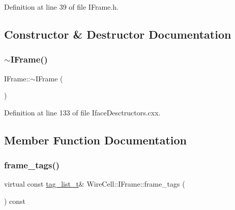 Definition at line 39 of file I\+Frame.\+h.



\subsection{Constructor \& Destructor Documentation}
\mbox{\label{class_wire_cell_1_1_i_frame_a7f25061ae34cc3ec3b3a18805cde79bb}} 
\subsubsection{\texorpdfstring{$\sim$\+I\+Frame()}{~IFrame()}}
{\footnotesize\ttfamily I\+Frame\+::$\sim$\+I\+Frame (\begin{DoxyParamCaption}{ }\end{DoxyParamCaption})\hspace{0.3cm}{\ttfamily [virtual]}}



Definition at line 133 of file Iface\+Desctructors.\+cxx.



\subsection{Member Function Documentation}
\mbox{\label{class_wire_cell_1_1_i_frame_a4de75840db5d079b285e29c0e7f081e5}} 
\subsubsection{\texorpdfstring{frame\+\_\+tags()}{frame\_tags()}}
{\footnotesize\ttfamily virtual const \hyperlink{class_wire_cell_1_1_i_frame_ab34485d40e352997c21b9ec99504ba7c}{tag\+\_\+list\+\_\+t}\& Wire\+Cell\+::\+I\+Frame\+::frame\+\_\+tags (\begin{DoxyParamCaption}{ }\end{DoxyParamCaption}) const\hspace{0.3cm}{\ttfamily [pure virtual]}}




